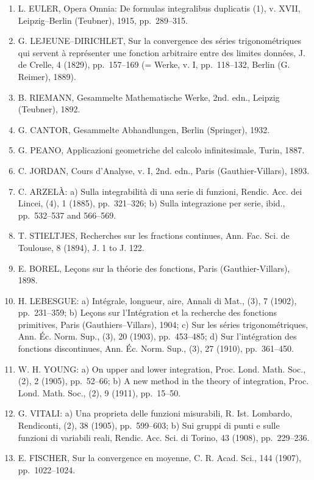 \begin{enumerate}
\def\labelenumi{(\Roman{enumi})}
\item
  L. EULER, Opera Omnia: De formulas integralibus duplicatis (1), v. XVII, Leipzig--Berlin (Teubner), 1915, pp.~289--315.
\item
  G. LEJEUNE--DIRICHLET, Sur la convergence des séries trigonométriques qui servent à représenter une fonction arbitraire entre des limites données, J. de Crelle, 4 (1829), pp.~157--169 (= Werke, v. I, pp.~118--132, Berlin (G. Reimer), 1889).
\item
  B. RIEMANN, Gesammelte Mathematische Werke, 2nd. edn., Leipzig (Teubner), 1892.
\item
  G. CANTOR, Gesammelte Abhandlungen, Berlin (Springer), 1932.
\item
  G. PEANO, Applicazioni geometriche del calcolo infinitesimale, Turin, 1887.
\item
  C. JORDAN, Cours d'Analyse, v. I, 2nd. edn., Paris (Gauthier-Villars), 1893.
\item
  C. ARZELÀ: a) Sulla integrabilità di una serie di funzioni, Rendic. Acc. dei Lincei, (4), 1 (1885), pp.~321--326; b) Sulla integrazione per serie, ibid., pp.~532--537 and 566--569.
\item
  T. STIELTJES, Recherches sur les fractions continues, Ann. Fac. Sci. de Toulouse, 8 (1894), J. 1 to J. 122.
\item
  E. BOREL, Leçons sur la théorie des fonctions, Paris (Gauthier-Villars), 1898.
\item
  H. LEBESGUE: a) Intégrale, longueur, aire, Annali di Mat., (3), 7 (1902), pp.~231--359; b) Leçons sur l'Intégration et la recherche des fonctions primitives, Paris (Gauthiers--Villars), 1904; c) Sur les séries trigonométriques, Ann. Éc. Norm. Sup., (3), 20 (1903), pp.~453--485; d) Sur l'intégration des fonctions discontinues, Ann. Éc. Norm. Sup., (3), 27 (1910), pp.~361--450.
\item
  W. H. YOUNG: a) On upper and lower integration, Proc. Lond. Math. Soc., (2), 2 (1905), pp.~52--66; b) A new method in the theory of integration, Proc. Lond. Math. Soc., (2), 9 (1911), pp.~15--50.
\item
  G. VITALI: a) Una proprieta delle funzioni misurabili, R. Ist. Lombardo, Rendiconti, (2), 38 (1905), pp.~599--603; b) Sui gruppi di punti e sulle funzioni di variabili reali, Rendic. Acc. Sci. di Torino, 43 (1908), pp.~229--236.
\item
  E. FISCHER, Sur la convergence en moyenne, C. R. Acad. Sci., 144 (1907), pp.~1022--1024.

\end{enumerate}
